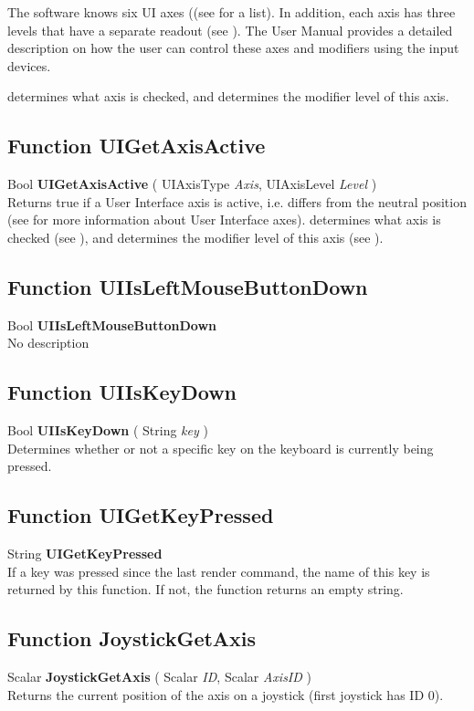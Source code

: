 The software knows six UI axes ((see  for a list). In addition, each axis has three levels that have a separate readout (see ). The User Manual provides a detailed description on how the user can control these axes and modifiers using the input devices.

 determines what axis is checked, and  determines the modifier level of this axis.


\subsection{Function UIGetAxisActive \label{F:UIGetAxisActive}}
Bool \textbf{UIGetAxisActive} ( UIAxisType \textit{Axis}, UIAxisLevel \textit{Level} ) \\
Returns true if a User Interface axis is active, i.e. differs from the neutral position (see  for more information about User Interface axes).  determines what axis is checked (see ), and  determines the modifier level of this axis (see ).

\subsection{Function UIIsLeftMouseButtonDown \label{F:UIIsLeftMouseButtonDown}}
Bool \textbf{UIIsLeftMouseButtonDown} \\
No description

\subsection{Function UIIsKeyDown \label{F:UIIsKeyDown}}
Bool \textbf{UIIsKeyDown} ( String \textit{key} ) \\
Determines whether or not a specific key on the keyboard is currently being pressed.

\subsection{Function UIGetKeyPressed \label{F:UIGetKeyPressed}}
String \textbf{UIGetKeyPressed} \\
If a key was pressed since the last render command, the name of this key is returned by this function. If not, the function returns an empty string.

\subsection{Function JoystickGetAxis \label{F:JoystickGetAxis}}
Scalar \textbf{JoystickGetAxis} ( Scalar \textit{ID}, Scalar \textit{AxisID} ) \\
Returns the current position of the axis on a joystick (first joystick has ID 0).

